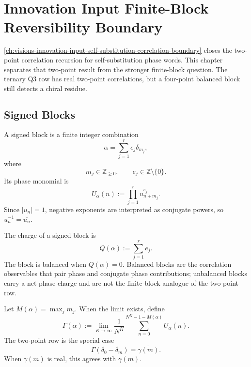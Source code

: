 \chapter{Innovation Input Finite-Block Reversibility Boundary}
\label{ch:visions-innovation-input-finite-block-reversibility-boundary}

\autoref{ch:visions-innovation-input-self-substitution-correlation-boundary}
closes the two-point correlation recursion for self-substitution phase
words. This chapter separates that two-point result from the stronger
finite-block question. The ternary Q3 row has real two-point correlations,
but a four-point balanced block still detects a chiral residue.

\section{Signed Blocks}
\label{sec:innovation-input-finite-block-signed-blocks}

\begin{definition}
\label{def:innovation-input-signed-block}
A signed block is a finite integer combination
$$
\alpha=\sum_{j=1}^r e_j\delta_{m_j},
$$
where
$$
m_j\in\mathbb Z_{\ge0},
\qquad
e_j\in\mathbb Z\setminus\{0\}.
$$
Its phase monomial is
$$
U_\alpha(n)
:=
\prod_{j=1}^r u_{n+m_j}^{e_j}.
$$
Since $|u_n|=1$, negative exponents are interpreted as conjugate powers,
so $u_n^{-1}=\overline{u_n}$.
\end{definition}

\begin{definition}
\label{def:innovation-input-balanced-block}
The charge of a signed block is
$$
Q(\alpha):=\sum_{j=1}^r e_j.
$$
The block is balanced when $Q(\alpha)=0$. Balanced blocks are the
correlation observables that pair phase and conjugate phase contributions;
unbalanced blocks carry a net phase charge and are not the finite-block
analogue of the two-point row.
\end{definition}

\begin{definition}
\label{def:innovation-input-finite-block-correlation}
Let $M(\alpha)=\max_j m_j$. When the limit exists, define
$$
\Gamma(\alpha)
:=
\lim_{K\to\infty}
\frac{1}{N^K}
\sum_{n=0}^{N^K-1-M(\alpha)}
U_\alpha(n).
$$
The two-point row is the special case
$$
\Gamma(\delta_0-\delta_m)=\overline{\gamma(m)}.
$$
When $\gamma(m)$ is real, this agrees with $\gamma(m)$.
\end{definition}

